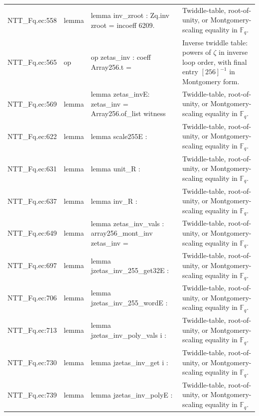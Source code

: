 \documentclass[10pt]{article}
\begin{document}
\begin{longtable}{L{0.11\textwidth}L{0.05\textwidth}L{0.38\textwidth}L{0.42\textwidth}}
NTT\_Fq.\allowbreak{}ec:\allowbreak{}558 & lemma & {\ttfamily\scriptsize lemma inv\_zroot : Zq.inv zroot = incoeff 6209.} & Twiddle-table, root-of-unity, or Montgomery-scaling equality in $\mathbb F_q$. \\
NTT\_Fq.\allowbreak{}ec:\allowbreak{}565 & op & {\ttfamily\scriptsize op zetas\_inv : coeff Array256.t =} & Inverse twiddle table: powers of $\zeta$ in inverse loop order, with final entry $[256]^{-1}$ in Montgomery form. \\
NTT\_Fq.\allowbreak{}ec:\allowbreak{}569 & lemma & {\ttfamily\scriptsize lemma zetas\_invE: zetas\_inv = Array256.of\_list witness} & Twiddle-table, root-of-unity, or Montgomery-scaling equality in $\mathbb F_q$. \\
NTT\_Fq.\allowbreak{}ec:\allowbreak{}622 & lemma & {\ttfamily\scriptsize lemma scale255E :} & Twiddle-table, root-of-unity, or Montgomery-scaling equality in $\mathbb F_q$. \\
NTT\_Fq.\allowbreak{}ec:\allowbreak{}631 & lemma & {\ttfamily\scriptsize lemma unit\_R :} & Twiddle-table, root-of-unity, or Montgomery-scaling equality in $\mathbb F_q$. \\
NTT\_Fq.\allowbreak{}ec:\allowbreak{}637 & lemma & {\ttfamily\scriptsize lemma inv\_R :} & Twiddle-table, root-of-unity, or Montgomery-scaling equality in $\mathbb F_q$. \\
NTT\_Fq.\allowbreak{}ec:\allowbreak{}649 & lemma & {\ttfamily\scriptsize lemma zetas\_inv\_vals : array256\_mont\_inv zetas\_inv =} & Twiddle-table, root-of-unity, or Montgomery-scaling equality in $\mathbb F_q$. \\
NTT\_Fq.\allowbreak{}ec:\allowbreak{}697 & lemma & {\ttfamily\scriptsize lemma jzetas\_inv\_255\_get32E :} & Twiddle-table, root-of-unity, or Montgomery-scaling equality in $\mathbb F_q$. \\
NTT\_Fq.\allowbreak{}ec:\allowbreak{}706 & lemma & {\ttfamily\scriptsize lemma jzetas\_inv\_255\_wordE :} & Twiddle-table, root-of-unity, or Montgomery-scaling equality in $\mathbb F_q$. \\
NTT\_Fq.\allowbreak{}ec:\allowbreak{}713 & lemma & {\ttfamily\scriptsize lemma jzetas\_inv\_poly\_vals i :} & Twiddle-table, root-of-unity, or Montgomery-scaling equality in $\mathbb F_q$. \\
NTT\_Fq.\allowbreak{}ec:\allowbreak{}730 & lemma & {\ttfamily\scriptsize lemma jzetas\_inv\_get i :} & Twiddle-table, root-of-unity, or Montgomery-scaling equality in $\mathbb F_q$. \\
NTT\_Fq.\allowbreak{}ec:\allowbreak{}739 & lemma & {\ttfamily\scriptsize lemma jzetas\_inv\_polyE :} & Twiddle-table, root-of-unity, or Montgomery-scaling equality in $\mathbb F_q$. \\

\end{longtable}
\end{document}

